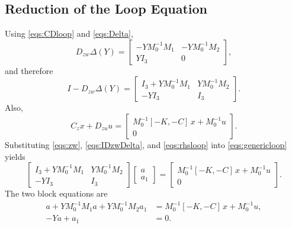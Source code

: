 \documentclass[11pt]{article}
\begin{document}
\subsection{Reduction of the Loop Equation}
Using \eqref{eqs:CDloop} and \eqref{eqs:Delta},
\begin{equation}
    D_{zw}\Delta(Y)
    =
    \begin{bmatrix}
        -Y M_0^{-1}M_1 & -Y M_0^{-1}M_2 \\
        Y I_3 & 0
    \end{bmatrix},
    \label{eqs:DzwDelta}
\end{equation}
and therefore
\begin{equation}
    I - D_{zw}\Delta(Y)
    =
    \begin{bmatrix}
        I_3 + Y M_0^{-1}M_1 & Y M_0^{-1}M_2 \\
        -Y I_3 & I_3
    \end{bmatrix}.
    \label{eqs:IDzwDelta}
\end{equation}
Also,
\begin{equation}
    C_z x + D_{zu}u
    =
    \begin{bmatrix}
        M_0^{-1}[-K,-C]\,x + M_0^{-1}u \\
        0
    \end{bmatrix}.
    \label{eqs:rhsloop}
\end{equation}
Substituting \eqref{eqs:zw}, \eqref{eqs:IDzwDelta}, and \eqref{eqs:rhsloop}
into \eqref{eqs:genericloop} yields
\begin{equation}
    \begin{bmatrix}
        I_3 + Y M_0^{-1}M_1 & Y M_0^{-1}M_2 \\
        -Y I_3 & I_3
    \end{bmatrix}
    \begin{bmatrix}
        a \\
        a_1
    \end{bmatrix}
    =
    \begin{bmatrix}
        M_0^{-1}[-K,-C]\,x + M_0^{-1}u \\
        0
    \end{bmatrix}.
    \label{eqs:blockloop}
\end{equation}
The two block equations are
\begin{align}
    a + Y M_0^{-1}M_1 a + Y M_0^{-1}M_2 a_1
    &= M_0^{-1}[-K,-C]\,x + M_0^{-1}u,
    \label{eqs:block1} \\
    -Ya + a_1 &= 0.
    \label{eqs:block2}
\end{align}
\end{document}

